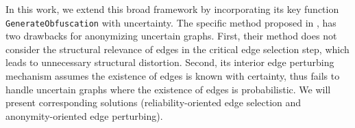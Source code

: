 \begin{sloppypar}
In this work, we extend this broad framework by incorporating its key function \texttt{GenerateObfuscation} with uncertainty. The specific method proposed in \cite{Boldi_Injecting_2012}, has two drawbacks for anonymizing uncertain graphs. First, their method does not consider the structural relevance of edges in the critical edge selection step, which leads to unnecessary structural distortion. Second, its interior edge perturbing mechanism assumes the existence of edges is known with certainty, thus fails to handle uncertain graphs where the existence of edges is probabilistic. We will present corresponding solutions (reliability-oriented edge selection and anonymity-oriented edge perturbing). 
\end{sloppypar}


% 

